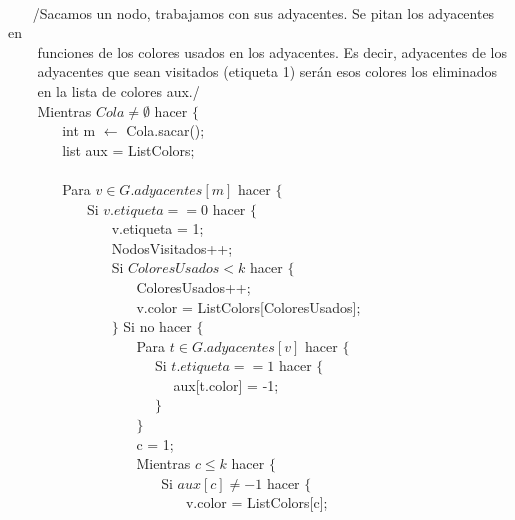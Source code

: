 \documentclass[a4paper,12pt]{article}
\begin{document}
\\
$~~~~~~~~$/Sacamos un nodo, trabajamos con sus adyacentes. Se pitan los adyacentes en\\ $~~~~~~~~$ funciones de los colores usados en los adyacentes. Es decir, adyacentes de los\\ $~~~~~~~~$ adyacentes que sean visitados (etiqueta 1) serán esos colores los eliminados \\ $~~~~~~~~$ en la lista de colores aux./\\
$~~~~~~~~$ Mientras $Cola \neq \emptyset$ hacer $\{$ \\
$~~~~~~~~~~~~~~~~$ int m $\leftarrow$ Cola.sacar();\\
$~~~~~~~~~~~~~~~~$ list aux = ListColors;\\
\\
$~~~~~~~~~~~~~~~~$ Para $v \in G.adyacentes[m]$ hacer $\{$ \\
$~~~~~~~~~~~~~~~~~~~~~~~~$ Si $v.etiqueta == 0$ hacer $\{$ \\
$~~~~~~~~~~~~~~~~~~~~~~~~~~~~~~~~$ v.etiqueta = 1;\\
$~~~~~~~~~~~~~~~~~~~~~~~~~~~~~~~~$ NodosVisitados++;\\
$~~~~~~~~~~~~~~~~~~~~~~~~~~~~~~~~$ Si $ColoresUsados < k$ hacer $\{$ \\
$~~~~~~~~~~~~~~~~~~~~~~~~~~~~~~~~~~~~~~~~$ ColoresUsados++;\\
$~~~~~~~~~~~~~~~~~~~~~~~~~~~~~~~~~~~~~~~~$ v.color = ListColors[ColoresUsados]; \\
$~~~~~~~~~~~~~~~~~~~~~~~~~~~~~~~~$ $\}$ Si no hacer $\{$ \\
$~~~~~~~~~~~~~~~~~~~~~~~~~~~~~~~~~~~~~~~~$ Para $t \in G.adyacentes[v]$ hacer $\{$ \\	
$~~~~~~~~~~~~~~~~~~~~~~~~~~~~~~~~~~~~~~~~~~~~~~$ Si $t.etiqueta == 1$ hacer $\{$\\
$~~~~~~~~~~~~~~~~~~~~~~~~~~~~~~~~~~~~~~~~~~~~~~~~~~~~$ aux[t.color] = -1;\\
$~~~~~~~~~~~~~~~~~~~~~~~~~~~~~~~~~~~~~~~~~~~~~~$ $\}$\\
$~~~~~~~~~~~~~~~~~~~~~~~~~~~~~~~~~~~~~~~~$ $\}$\\
$~~~~~~~~~~~~~~~~~~~~~~~~~~~~~~~~~~~~~~~~$ c = 1;\\
$~~~~~~~~~~~~~~~~~~~~~~~~~~~~~~~~~~~~~~~~$ Mientras $c \leq k$ hacer $\{$ \\
$~~~~~~~~~~~~~~~~~~~~~~~~~~~~~~~~~~~~~~~~~~~~~~~~$ Si $aux[c] \neq -1$ hacer $\{$ \\
$~~~~~~~~~~~~~~~~~~~~~~~~~~~~~~~~~~~~~~~~~~~~~~~~~~~~~~~~$ v.color = ListColors[c];	\\
\end{document}
